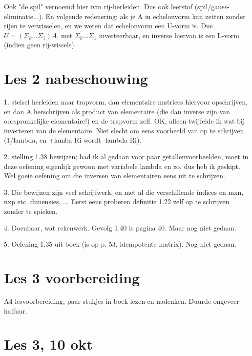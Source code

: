 \documentclass{article}
\begin{document}
Ook "de spil" vernoemd hier ivm rij-herleiden. Dus ook leerstof (spil/gauss-eliminatie...). En volgende redenering: als je A in echelonvorm kan zetten zonder rijen te verwisselen, en we weten dat echelonvorm een U-vorm is. Dus $U= (\Sigma_k ... \Sigma_1) A$, met $\Sigma_k ... \Sigma_1$ inverteerbaar, en inverse hiervan is een L-vorm (indien geen rij-wissels). 


\section{Les 2 nabeschouwing}

1. stelsel herleiden naar trapvorm, dan elementaire matrices hiervoor opschrijven, en dan A herschrijven als product van elementaire (die dan inverse zijn van oorspronkelijke elementaire!) en de trapvorm zelf. 
OK, alleen twijfelde ik wat bij inverteren van de elementaire. Niet slecht om eens voorbeeld van op te schrijven (1/lambda, en +lamba Ri wordt -lambda Ri). 

2. stelling 1.38 bewijzen; had ik al gedaan voor paar getallenvoorbeelden, moet in deze oefening eigenlijk gewoon met variabele lambda en zo, dus heb ik geskipt. Wel goeie oefening om die inversen van elementairen eens uit te schrijven. 

3. Die bewijzen zijn veel schrijfwerk, en met al die verschillende indices en mxn, nxp etc. dimensies, ... Eerst eens proberen definitie 1.22 zelf op te schrijven zonder te spieken. 

4. Doenbaar, wat rekenwerk. Gevolg 1.40 is pagina 40. Maar nog niet gedaan. 

5. Oefening 1.35 uit boek (is op p. 53, idempotente matrix). Nog niet gedaan. 


\section{Les 3 voorbereiding}

A4 lesvoorbereiding, paar stukjes in boek lezen en nadenken. Duurde ongeveer halfuur. 

\section{Les 3, 10 okt}
\end{document}
